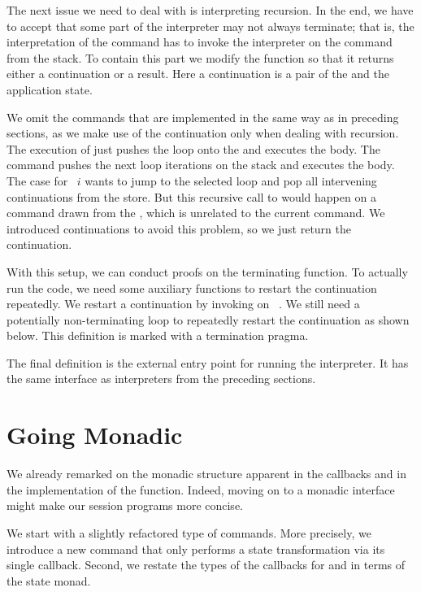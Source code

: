\documentclass[acmsmall,screen]{acmart}
\begin{document}
The next issue we need to deal with is interpreting recursion. In the
end, we have to accept that some part of the interpreter may not always
terminate; that is, the interpretation of the {\ACONTINUE}
command has to invoke the interpreter on the {\AMU} command from the
stack. To contain this part we modify the {\Aexecutor} function so
that it returns either a continuation or a result. Here a continuation
is a pair of the {\ACommandStack} and the application state.
\rstAlternative

We omit the commands that are implemented in the same way as in
preceding sections, as we make use of the continuation only when dealing with recursion. 
The execution of {\AMU} just pushes the loop onto the
{\ACommandStack} and executes the body.
The {\AUNROLL} command pushes the next loop iterations on the stack
and executes the body.
The case for {\ACONTINUE~$i$} wants to jump to the selected loop and pop
all intervening continuations from the store. But this recursive
call to {\Aexecutor} would happen on a command drawn from the
{\ACommandStack}, which is unrelated to the current command.
We introduced continuations to avoid this problem, so we just return
the continuation.

With this setup, we can conduct proofs on the terminating {\Aexecutor}
function. To actually run the code, we need some auxiliary functions
to restart the continuation repeatedly.
We restart a continuation by invoking
{\Aexecutor} on ~\Azero. 
\rstAlternativeExecutorRestart
We still need a potentially non-terminating loop to repeatedly restart the
continuation as shown below. This definition is marked with a
termination pragma.
\rstAlternativeExecutorHSRestart

The final definition is the external entry point for running the
interpreter. It has the same interface as interpreters from the
preceding sections.

\section{Going Monadic}
\label{sec:going-monadic}


We already remarked on the monadic structure apparent in the
callbacks and in the implementation of the {\Aexecutor}
function. Indeed, moving on to a monadic interface might make our session
programs more concise.

We start with a slightly refactored type of commands. More precisely,
we introduce a new {\ACSKIP} command that only performs a state 
transformation via its single callback.
Second, we restate the types of the callbacks for {\ACSEND} and
{\ACRECV} in terms of the state monad.
\end{document}
